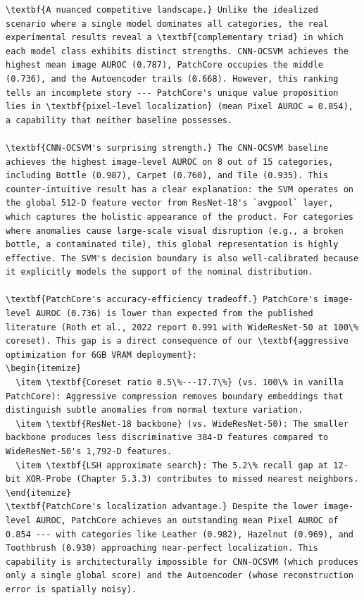 \documentclass[12pt,a4paper,oneside]{report}
\begin{document}
\begin{verbatim}
\textbf{A nuanced competitive landscape.} Unlike the idealized scenario where a single model dominates all categories, the real experimental results reveal a \textbf{complementary triad} in which each model class exhibits distinct strengths. CNN-OCSVM achieves the highest mean image AUROC (0.787), PatchCore occupies the middle (0.736), and the Autoencoder trails (0.668). However, this ranking tells an incomplete story --- PatchCore's unique value proposition lies in \textbf{pixel-level localization} (mean Pixel AUROC = 0.854), a capability that neither baseline possesses.

\textbf{CNN-OCSVM's surprising strength.} The CNN-OCSVM baseline achieves the highest image-level AUROC on 8 out of 15 categories, including Bottle (0.987), Carpet (0.760), and Tile (0.935). This counter-intuitive result has a clear explanation: the SVM operates on the global 512-D feature vector from ResNet-18's `avgpool` layer, which captures the holistic appearance of the product. For categories where anomalies cause large-scale visual disruption (e.g., a broken bottle, a contaminated tile), this global representation is highly effective. The SVM's decision boundary is also well-calibrated because it explicitly models the support of the nominal distribution.

\textbf{PatchCore's accuracy-efficiency tradeoff.} PatchCore's image-level AUROC (0.736) is lower than expected from the published literature (Roth et al., 2022 report 0.991 with WideResNet-50 at 100\% coreset). This gap is a direct consequence of our \textbf{aggressive optimization for 6GB VRAM deployment}:
\begin{itemize}
  \item \textbf{Coreset ratio 0.5\%---17.7\%} (vs. 100\% in vanilla PatchCore): Aggressive compression removes boundary embeddings that distinguish subtle anomalies from normal texture variation.
  \item \textbf{ResNet-18 backbone} (vs. WideResNet-50): The smaller backbone produces less discriminative 384-D features compared to WideResNet-50's 1,792-D features.
  \item \textbf{LSH approximate search}: The 5.2\% recall gap at 12-bit XOR-Probe (Chapter 5.3.3) contributes to missed nearest neighbors.
\end{itemize}
\textbf{PatchCore's localization advantage.} Despite the lower image-level AUROC, PatchCore achieves an outstanding mean Pixel AUROC of 0.854 --- with categories like Leather (0.982), Hazelnut (0.969), and Toothbrush (0.930) approaching near-perfect localization. This capability is architecturally impossible for CNN-OCSVM (which produces only a single global score) and the Autoencoder (whose reconstruction error is spatially noisy).



\end{verbatim}
\end{document}

